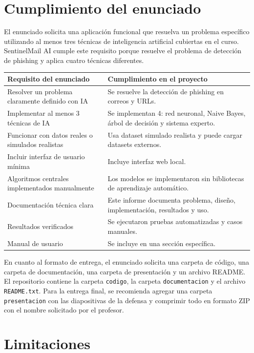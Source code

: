 \documentclass[12pt,letterpaper]{article}
\begin{document}
\section{Cumplimiento del enunciado}

El enunciado solicita una aplicación funcional que resuelva un problema específico utilizando al menos tres técnicas de inteligencia artificial cubiertas en el curso. SentinelMail AI cumple este requisito porque resuelve el problema de detección de phishing y aplica cuatro técnicas diferentes.

\begin{longtable}{p{7cm}p{7cm}}
\toprule
\textbf{Requisito del enunciado} & \textbf{Cumplimiento en el proyecto} \\
\midrule
Resolver un problema claramente definido con IA & Se resuelve la detección de phishing en correos y URLs. \\
Implementar al menos 3 técnicas de IA & Se implementan 4: red neuronal, Naive Bayes, árbol de decisión y sistema experto. \\
Funcionar con datos reales o simulados realistas & Usa dataset simulado realista y puede cargar datasets externos. \\
Incluir interfaz de usuario mínima & Incluye interfaz web local. \\
Algoritmos centrales implementados manualmente & Los modelos se implementaron sin bibliotecas de aprendizaje automático. \\
Documentación técnica clara & Este informe documenta problema, diseño, implementación, resultados y uso. \\
Resultados verificados & Se ejecutaron pruebas automatizadas y casos manuales. \\
Manual de usuario & Se incluye en una sección específica. \\
\bottomrule
\end{longtable}

En cuanto al formato de entrega, el enunciado solicita una carpeta de código, una carpeta de documentación, una carpeta de presentación y un archivo README. El repositorio contiene la carpeta \texttt{codigo}, la carpeta \texttt{documentacion} y el archivo \texttt{README.txt}. Para la entrega final, se recomienda agregar una carpeta \texttt{presentacion} con las diapositivas de la defensa y comprimir todo en formato ZIP con el nombre solicitado por el profesor.

\section{Limitaciones}
\end{document}

